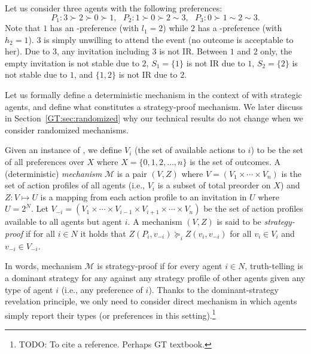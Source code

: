 \begin{example} \label{GT:eg:noStableSet}
	Let us consider three agents with the following preferences: 
	\begin{equation*}
				P_1: 3\succ 2 \succ 0 \succ 1,~~~ P_2: 1 \succ 0 \succ 2 \sim 3,~~~ P_3: 0 \succ 1 \sim 2 \sim 3.
	\end{equation*}
	Note that $1$ has an \INC-preference (with $l_1 = 2$) while $2$ has a \DEC-preference (with  $h_2 = 1$). $3$ is simply unwilling to attend the event (no outcome is acceptable to her).
	Due to $3$, any invitation including $3$ is not IR. Between $1$ and $2$ only, the empty invitation is not stable due to $2$, $S_1 = \{1\}$ is not IR due to $1$, $S_2 = \{2\}$ is not stable due to $1$, and $\{1, 2\}$ is not IR due to $2$.
\end{example}

Let us formally define a deterministic mechanism in the context of \AOIPs with strategic agents, and define what constitutes a strategy-proof mechanism. We later discuss in Section~\ref{GT:sec:randomized} why our technical results do not change when we consider randomized mechanisms.

\begin{definition} \label{GT:def:mechanism}
Given an instance of \AOIP, we define $V_i$ (the set of available actions to $i$) to be the set of all preferences over $X$ where $X = \{0, 1, 2, \dots, n\}$ is the set of outcomes. 
A (deterministic) \emph{mechanism} $\mathcal{M}$ is a pair $(V, Z)$ where $V = (V_1 \times \cdots \times V_n)$ is the set of action profiles of all agents (i.e., $V_i$ is a subset of total preorder on $X$) and $Z: V \mapsto U$ is a mapping from each action profile to an invitation in $U$ where $U = 2^{N}$. 
Let $V_{-i} = (V_1 \times \cdots \times V_{i-1} \times V_{i+1} \times \cdots \times V_{n})$ be the set of action profiles available to all agents but agent $i$. A mechanism $(V, Z)$ is said to be \emph{strategy-proof} if for all $i\in N$ it holds that $Z(P_i, v_{-i}) \succeq_i Z(v_i, v_{-i})$ for all $v_i \in V_i$ and $v_{-i} \in V_{-i}$.
\end{definition}

In words, mechanism $\mathcal{M}$ is strategy-proof if for every agent $i\in N$, truth-telling is a dominant strategy for any against any strategy profile of other agents given any type of agent $i$ (i.e., any preference of $i$). Thanks to the dominant-strategy revelation principle, we only need to consider direct mechanism in which agents simply report their types (or preferences in this setting).\footnote{TODO: To cite a reference. Perhaps GT textbook.}








